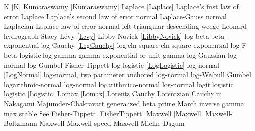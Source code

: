 %
K							\dotfill	\eqref{K}							\ncite	%
Kumaraswamy					\dotfill	\eqref{Kumaraswamy} 				\ncite	%
%
Laplace						\dotfill	\eqref{Laplace} 						\ncite	%
Laplace's first law of error			\dotfill	Laplace 							\ncite	%
Laplace's second law of error  		\dotfill	normal 							\ncite	%
Laplace-Gauss					\dotfill	normal 							\ncite	%
Laplacian  					\dotfill	Laplace							\ncite 	%
law of error					\dotfill	normal 							\ncite	%
left triangular					\dotfill	descending wedge					\ncite	%
Leonard hydrograph				\dotfill	Stacy 							\ncite	%
L\'{e}vy 						\dotfill	\eqref{Levy}						\ncite	%
Libby-Novick					\dotfill	\eqref{LibbyNovick}					\ncite	
log-beta						\dotfill	beta-exponential					 	%
log-Cauchy					\dotfill	\eqref{LogCauchy}					\ncite
log-chi-square					\dotfill	chi-square-exponential				\ncite	%
log-F							\dotfill	beta-logistic						\ncite	%
log-gamma 					\dotfill	gamma-exponential or unit-gamma		\ncite	%
log-Gaussian					\dotfill	log-normal						\ncite	%
log-Gumbel					\dotfill	Fisher-Tippett						\ncite	%
log-logistic					\dotfill	\eqref{LogLogistic}  					\ncite	%
log-normal					\dotfill	\eqref{LogNormal}					\ncite	%
log-normal, two parameter			\dotfill	anchored log-normal					\ncite	%
log-Weibull 					\dotfill	Gumbel 							\ncite	%
logarithmic-normal				\dotfill	log-normal 						\ncite	%
logarithmico-normal				\dotfill	log-normal 						\ncite	%
logit							\dotfill	logistic 							\ncite	%
logistic 						\dotfill	\eqref{Logistic} 						\ncite	%
Lomax 						\dotfill	\eqref{Lomax}						\ncite	%
Lorentz  						\dotfill	Cauchy 							\ncite	%
Lorentzian  					\dotfill	Cauchy 							\ncite	%
%
m 							\dotfill	Nakagami 						 	%
Majumder-Chakravart			\dotfill	generalized beta prime				 %
March 						\dotfill	inverse gamma						\ncite	%
max stable					\dotfill	See Fisher-Tippett \eqref{FisherTippett}	\ncite
Maxwell 						\dotfill	\eqref{Maxwell} 					\ncite	%
Maxwell-Boltzmann 				\dotfill	Maxwell 							\ncite 	%
Maxwell speed					\dotfill	Maxwell 							\ncite	%
Mielke						\dotfill	Dagum							\ncite	%
